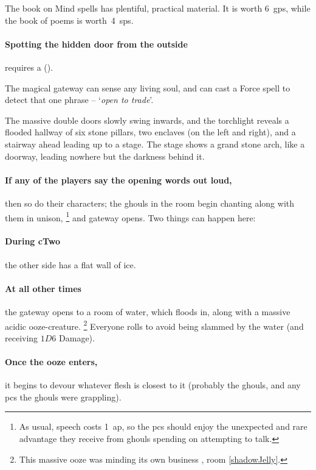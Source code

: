 The book on Mind spells has plentiful, practical material.
It is worth 6~\glspl{gp}, while the book of poems is worth~4~\glspl{sp}.

\paragraph{Spotting the hidden door from the outside}
requires a  (\tn[12]).


The magical gateway can sense any living soul, and can cast a Force spell to detect that one phrase -- `\textit{open to trade}'.

\begin{boxtext}
  The massive double doors slowly swing inwards, and the torchlight reveals a flooded hallway of six stone pillars, two enclaves (on the left and right), and a stairway ahead leading up to a stage.
  The stage shows a grand stone arch, like a doorway, leading nowhere but the darkness behind it.
\end{boxtext}

\paragraph{If any of the players say the opening words out loud,}
then so do their characters; the ghouls in the room begin chanting along with them in unison,%
\footnote{As usual, speech costs 1~\gls{ap}, so the \glspl{pc} should enjoy the unexpected and rare advantage they receive from ghouls spending  on attempting to talk.}
and gateway opens.
Two things can happen here:

\paragraph{During \gls{cTwo}}
the other side has a flat wall of ice.
\paragraph{At all other times}
the gateway opens to a room of water, which floods in, along with a massive acidic ooze-creature.%
\footnote{This massive ooze was minding its own business , room \ref{shadowJelly}.}
Everyone rolls  to avoid being slammed by the water (and receiving $1D6$ Damage).

\paragraph{Once the ooze enters,}
it begins to devour whatever flesh is closest to it (probably the ghouls, and any \glspl{pc} the ghouls were grappling).


